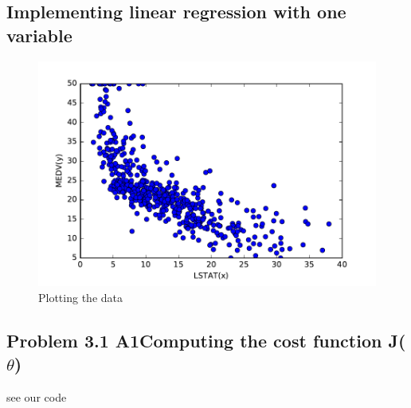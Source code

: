 \documentclass[pdftex,11pt]{article}
\begin{document}
\subsection{Implementing linear regression with one variable}

\begin{figure}[H]
  \caption{Plotting the data}
  \centering
    \includegraphics[scale=1]{fig1.pdf}
\end{figure}
\subsection{Problem 3.1 A1Computing the cost function J($\theta$)}
see our code 
\end{document}
